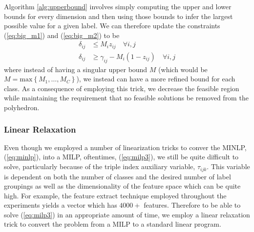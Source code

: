 \documentclass[../thesis.tex]{subfiles}
\begin{document}
Algorithm \ref{alg:upperbound} involves simply computing the upper and lower bounds for every dimension and then using those bounds to infer the largest possible value for a given label. We can therefore update the constraints (\ref{eq:big_m1}) and (\ref{eq:big_m2}) to be
\begin{align}
    \delta_{ij} &\leq M_i z_{ij} \quad \forall i, j \\
    \delta_{ij} &\geq \gamma_{ij} - M_i(1-z_{ij}) \quad \forall i, j
\end{align}
where instead of having a singular upper bound $M$ (which would be $M = \text{max} \left\{M_1, \ldots, M_C\right\}$), we instead can have a more refined bound for each class. As a consequence of employing this trick, we decrease the feasible region while maintaining the requirement that no feasible solutions be removed from the polyhedron.

\subsubsection{Linear Relaxation}
Even though we employed a number of linearization tricks to conver the MINLP, (\ref{eq:minlp}), into a MILP, oftentimes, (\ref{eq:milp3}), we still be quite difficult to solve, particularly because of the triple index auxiliary variable, $\tau_{ijk}$. This variable is dependent on both the number of classes and the desired number of label groupings as well as the dimensionality of the feature space which can be quite high. For example, the feature extract technique employed throughout the experiments yields a vector which has $4000+$ features. Therefore to be able to solve (\ref{eq:milp3}) in an appropriate amount of time, we employ a linear relaxation trick to convert the problem from a MILP to a standard linear program. 
\end{document}
